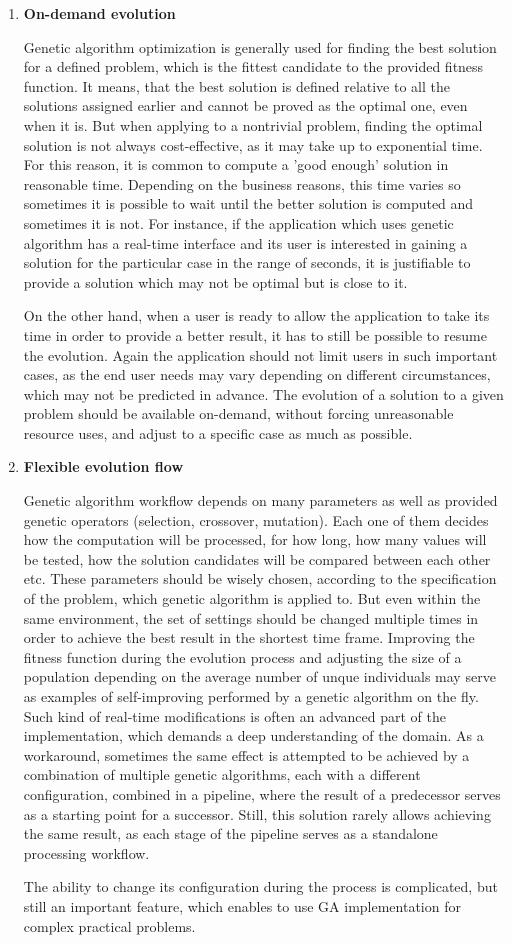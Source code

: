\begin{enumerate}
\item 
\textbf{On-demand evolution}

Genetic algorithm optimization is generally used for finding the best solution for a defined problem, which is the fittest candidate to the provided fitness function. It means, that the best solution is defined relative to all the solutions assigned earlier and cannot be proved as the optimal one, even when it is. But when applying to a nontrivial problem, finding the optimal solution is not always cost-effective, as it may take up to exponential time. For this reason, it is common to compute a 'good enough' solution in reasonable time. Depending on the business reasons, this time varies so sometimes it is possible to wait until the better solution is computed and sometimes it is not. For instance, if the application which uses genetic algorithm has a real-time interface and its user is interested in gaining a solution for the particular case in the range of seconds, it is justifiable to provide a solution which may not be optimal but is close to it.

On the other hand, when a user is ready to allow the application to take its time in order to provide a better result, it has to still be possible to resume the evolution. Again the application should not limit users in such important cases, as the end user needs may vary depending on different circumstances, which may not be predicted in advance. The evolution of a solution to a given problem should be available on-demand, without forcing unreasonable resource uses, and adjust to a specific case as much as possible.
\\

\item
\textbf{Flexible evolution flow}

Genetic algorithm workflow depends on many parameters as well as provided genetic operators (selection, crossover, mutation). Each one of them decides how the computation will be processed, for how long, how many values will be tested, how the solution candidates will be compared between each other etc. These parameters should be wisely chosen, according to the specification of the problem, which genetic algorithm is applied to. But even within the same environment, the set of settings should be changed multiple times in order to achieve the best result in the shortest time frame. Improving the fitness function during the evolution process and adjusting the size of a population depending on the average number of unque individuals may serve as examples of self-improving performed by a genetic algorithm on the fly. Such kind of real-time modifications is often an advanced part of the implementation, which demands a deep understanding of the domain. As a workaround, sometimes the same effect is attempted to be achieved by a combination of multiple genetic algorithms, each with a different configuration, combined in a pipeline, where the result of a predecessor serves as a starting point for a successor. Still, this solution rarely allows achieving the same result, as each stage of the pipeline serves as a standalone processing workflow.

The ability to change its configuration during the process is complicated, but still an important feature, which enables to use GA implementation for complex practical problems.

\end{enumerate}